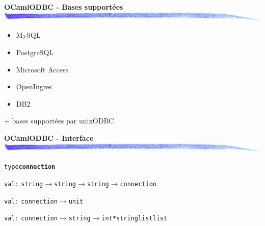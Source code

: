 \documentclass[landscape]{seminar}
\def\title#1#2{\noindent
{\bf\large #1}\\
\includegraphics[width=\textwidth]{bar.jpg.eps}
\vspace{#2cm}
}
\def\target#1{\hypertarget{#1}{}}
\begin{document}

\begin{slide}
\title{OCamlODBC - Bases support\'ees}{0.5}
\target{ocamlodbc1}
\begin{itemize}
\item MySQL
\item PostgreSQL
\item Microsoft Access
\item OpenIngres
\item DB2
\end{itemize}
+ bases support\'ees par unixODBC.

\end{slide}


\begin{slide}
\title{OCamlODBC - Interface}{0.5}
\target{ocamlodbc1}

{\tt type\hspace{0.2cm}}{\tt {\bf connection}}

{\tt val\hspace{0.2cm}{\bf connect}\hspace{0.2cm}:\hspace{0.2cm}}
{\tt string\hspace{0.2cm}$\rightarrow$\hspace{0.2cm}string\hspace{0.2cm}$\rightarrow$\hspace{0.2cm}string\hspace{0.2cm}$\rightarrow$\hspace{0.2cm}connection}

{\tt val\hspace{0.2cm}{\bf disconnect}\hspace{0.2cm}:\hspace{0.2cm}}
{\tt connection\hspace{0.2cm}$\rightarrow$\hspace{0.2cm}unit}

{\tt val\hspace{0.2cm}{\bf execute}\hspace{0.2cm}:\hspace{0.2cm}}
{\tt connection\hspace{0.2cm}$\rightarrow$\hspace{0.2cm}string\hspace{0.2cm}$\rightarrow$\hspace{0.2cm}int\hspace{0.2cm}*\hspace{0.2cm}string\hspace{0.2cm}list\hspace{0.2cm}list}


\end{slide}
\end{document}
